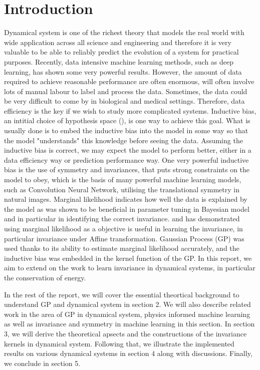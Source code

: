\documentclass{statsmsc}
\begin{document}
\chapter{Introduction}
Dynamical system is one of the richest theory that models the real world with wide application across all science and engineering and therefore it is very valuable to be able to reliably predict the evolution of a system for practical purposes.
Recently, data intensive machine learning methods, such as deep learning, has shown some very powerful results. 
However, the amount of data required to achieve reasonable performance are often enormous, will often involve lots of manual labour to label and process the data.
Sometimes, the data could be very difficult to come by in biological and medical settings.
Therefore, data efficiency is the key if we wish to study more complicated systems.
Inductive bias, an intitial choice of hypothesis space (\cite{Baxter2000}), is one way to achieve this goal.
What is usually done is to embed the inductive bias into the model in some way so that the model "understands" this knowledge before seeing the data.
Assuming the inductive bias is correct, we may expect the model to perform better, either in a data efficiency way or prediction performance way.
One very powerful inductive bias is the use of symmetry and invariances, that puts strong constraints on the model to obey, which is the basis of many powerful machine learning models, such as Convolution Neural Network, utilising the translational symmetry in natural images.
Marginal likelihood indicates how well the data is explained by the model as was shown to be beneficial in parameter tuning in Bayesian model and in particular in identifying the correct invariance. 
\cite{Mark2017} and \cite{Tycho2021} has demonstrated using marginal likelihood as a objective is useful in learning the invariance, in particular invariance under Affine transformation.
Gaussian Process (GP) was used thanks to its ability to estimate marginal likelihood accurately, and the inductive bias was embedded in the kernel function of the GP.
In this report, we aim to extend on the work to learn invariance in dynamical systems, in particular the conservation of energy.

In the rest of the report, we will cover the essential theortical background to understand GP and dynamical system in section 2. We will also describe related work in the area of GP in dynamical system, physics informed machine learning as well as invariance and symmetry in machine learning in this section.
In section 3, we will derive the theoretical apsects and the constructions of the invariance kernels in dynamical system.
Following that, we illustrate the implemented results on various dynamical systems in section 4 along with discussions.
Finally, we conclude in section 5.
\end{document}
